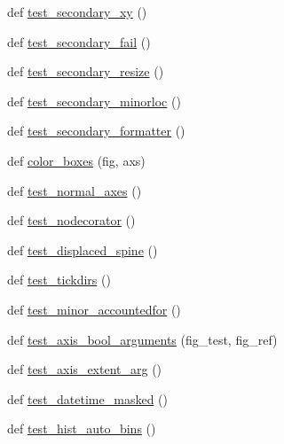 \begin{DoxyCompactItemize}
\item 
def \hyperlink{namespacematplotlib_1_1tests_1_1test__axes_a23d5e4514a0fcf6e0f4c3f11afa59798}{test\+\_\+secondary\+\_\+xy} ()
\item 
def \hyperlink{namespacematplotlib_1_1tests_1_1test__axes_ac0e3def9d8a0990ca57f651c4e12cd4b}{test\+\_\+secondary\+\_\+fail} ()
\item 
def \hyperlink{namespacematplotlib_1_1tests_1_1test__axes_aabbd7a829c2a95dff84c8c50074f9a3a}{test\+\_\+secondary\+\_\+resize} ()
\item 
def \hyperlink{namespacematplotlib_1_1tests_1_1test__axes_a4af6d561589ad936c0fc4cd52b81ca4f}{test\+\_\+secondary\+\_\+minorloc} ()
\item 
def \hyperlink{namespacematplotlib_1_1tests_1_1test__axes_a6e5f08e1b2751e84b34bdffbb08c903f}{test\+\_\+secondary\+\_\+formatter} ()
\item 
def \hyperlink{namespacematplotlib_1_1tests_1_1test__axes_a93f7f99ae52cf343343cd9e914364411}{color\+\_\+boxes} (fig, axs)
\item 
def \hyperlink{namespacematplotlib_1_1tests_1_1test__axes_a1d14d52c1e9f2b60a78653faf2a23b39}{test\+\_\+normal\+\_\+axes} ()
\item 
def \hyperlink{namespacematplotlib_1_1tests_1_1test__axes_a6425bc98028fbc6fad11af53a11d4633}{test\+\_\+nodecorator} ()
\item 
def \hyperlink{namespacematplotlib_1_1tests_1_1test__axes_acfdc7ce440307ce1b22146e6669bce69}{test\+\_\+displaced\+\_\+spine} ()
\item 
def \hyperlink{namespacematplotlib_1_1tests_1_1test__axes_a3a58f9e8a8de925bbb1abc586461791d}{test\+\_\+tickdirs} ()
\item 
def \hyperlink{namespacematplotlib_1_1tests_1_1test__axes_a7c70e0a3f2b74180af7e271671a97287}{test\+\_\+minor\+\_\+accountedfor} ()
\item 
def \hyperlink{namespacematplotlib_1_1tests_1_1test__axes_af9362ea3c209aecc813b79b936a13af3}{test\+\_\+axis\+\_\+bool\+\_\+arguments} (fig\+\_\+test, fig\+\_\+ref)
\item 
def \hyperlink{namespacematplotlib_1_1tests_1_1test__axes_ad4a0aa660190a7bc149dd4087ec1ebf3}{test\+\_\+axis\+\_\+extent\+\_\+arg} ()
\item 
def \hyperlink{namespacematplotlib_1_1tests_1_1test__axes_a584ba4204422bffead8c8ac8d6b35008}{test\+\_\+datetime\+\_\+masked} ()
\item 
def \hyperlink{namespacematplotlib_1_1tests_1_1test__axes_a6958fe3513f8d6a61c12e850f262b805}{test\+\_\+hist\+\_\+auto\+\_\+bins} ()

\end{DoxyCompactItemize}
